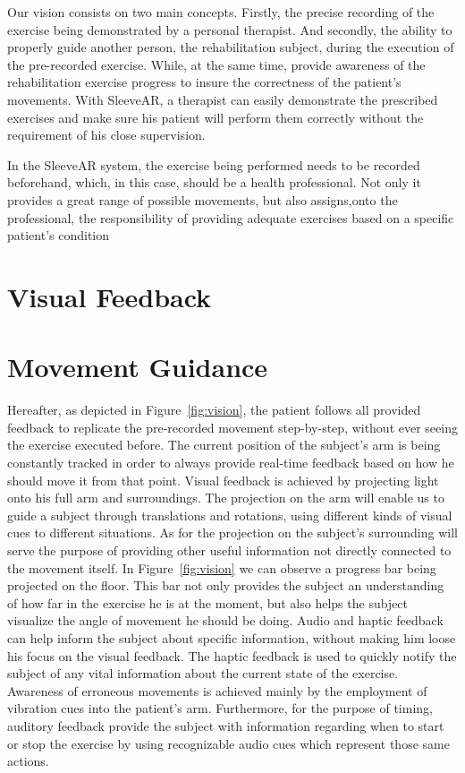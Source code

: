 Our vision consists on two main concepts. Firstly, the precise recording of the exercise being demonstrated by a personal therapist. 
And secondly, the ability to properly guide another person, the rehabilitation subject, during the execution of the pre-recorded exercise. 
While, at the same time, provide awareness of the rehabilitation exercise progress to insure the correctness of the patient's movements.
With SleeveAR, a therapist can easily demonstrate the prescribed exercises and make sure his patient will perform them correctly without the requirement of his close supervision.

In the SleeveAR system, the exercise being performed needs to be recorded beforehand, which, in this case, should be a health professional. 
Not only it provides a great range of possible movements, but also assigns,onto the professional, the responsibility of providing adequate exercises based on a specific patient's condition


\section{Visual Feedback}



\section{Movement Guidance}
Hereafter, as depicted in Figure~\ref{fig:vision}, 
the patient follows all provided feedback to replicate the pre-recorded movement step-by-step, without ever seeing the exercise executed before.
The current position of the subject's arm is being constantly tracked in order to always provide real-time 
feedback based on how he should move it from that point.
Visual feedback is achieved by projecting light onto his full arm and surroundings. The projection on the arm will enable us to 
guide a subject through translations and rotations, using different kinds of visual cues to different situations. As for the projection on the subject's surrounding 
will serve the purpose of providing other useful information not directly connected to the movement itself. 
In Figure~\ref{fig:vision} we can observe a progress bar being projected on the floor. 
This bar not only provides the subject an understanding of how far in the exercise he is at the moment, but also helps the subject visualize the angle of movement he should be doing.
Audio and haptic feedback can help inform the subject about specific information, without making him loose his focus on the visual feedback.
The haptic feedback is used to quickly notify the subject of any vital information about the current state of the exercise. 
Awareness of erroneous movements is achieved mainly by the employment of vibration cues into the patient's arm.
Furthermore, for the purpose of timing, auditory feedback provide the subject with information regarding when to start or stop the exercise by using recognizable audio cues which represent those same actions.

